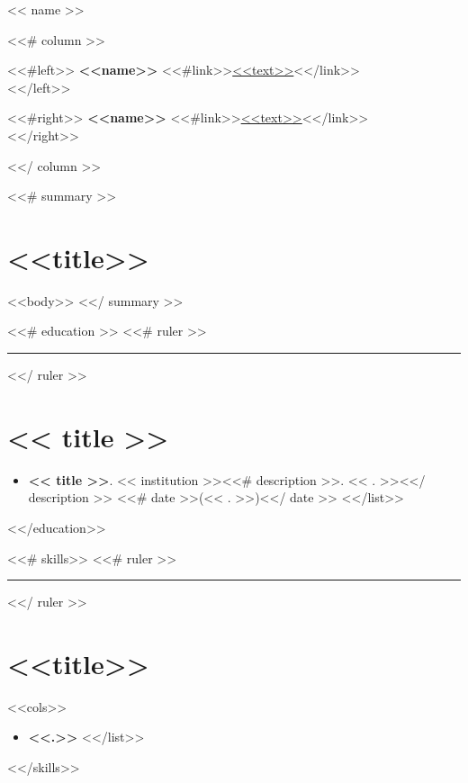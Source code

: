 \documentclass[<<fontsize>>]{article}
\def\resumeruler{\begin{center}\rule{0.5\linewidth}{0.5pt}\end{center}}
\providecommand{\tightlist}{%
  \setlength{\itemsep}{0pt}\setlength{\parskip}{0pt}}
\begin{document}
{\huge << name >>}


<<# column >>
\bigskip

\begin{minipage}[t]{0.495\textwidth}
  <<#left>>
  \textbf{<<name>>} <<#link>>\href{<<to>>}{<<text>>}<</link>>\\
  <</left>>
\end{minipage} %
\begin{minipage}[t]{0.495\textwidth}
  <<#right>>
  \textbf{<<name>>} <<#link>>\href{<<to>>}{<<text>>}<</link>>\\
  <</right>>
\end{minipage}
<</ column >>



<<# summary >>
\section{<<title>>}

<<body>>
<</ summary >>


<<# education >>
<<# ruler >>\resumeruler<</ ruler >>
\section{<< title >>}

\begin{itemize}
  \tightlist
  <<# list >>
  \item \textbf{<< title >>}. << institution >><<# description >>. << . >><</ description >> <<# date >>(<< . >>)<</ date >>
  <</list>>
\end{itemize}
<</education>>


<<# skills>>
<<# ruler >>\resumeruler<</ ruler >>
\section{<<title>>}

\begin{multicols}{<<cols>>}
  \begin{itemize}
    <<#list>>
    \item \textbf{<<.>>}
    <</list>>
  \end{itemize}
\end{multicols}
<</skills>>
\end{document}
